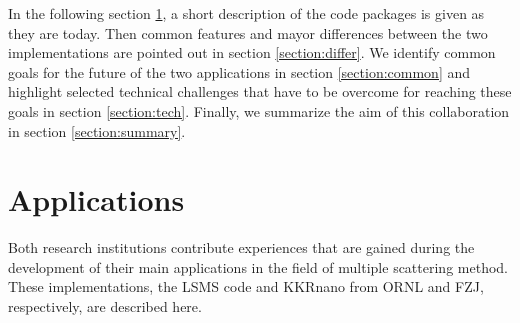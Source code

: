 \documentclass{llncs}
\def\KKRnano{{KKRnano}}
\def\LSMS{{LSMS}}
\begin{document}
In the following section \ref{section:apps}, a short description of the code packages is given as they are today.
Then common features and mayor differences between the two implementations are pointed out in section \ref{section:differ}.
We identify common goals for the future of the two applications in section \ref{section:common}
and highlight selected technical challenges that have to be overcome for reaching these goals in section \ref{section:tech}.
Finally, we summarize the aim of this collaboration in section \ref{section:summary}.

\section{Applications} \label{section:apps}

Both research institutions contribute experiences that are gained during the development
of their main applications in the field of multiple scattering method.
These implementations, the \LSMS{} code and \KKRnano{} from ORNL and FZJ, respectively, are described here.

\end{document}
